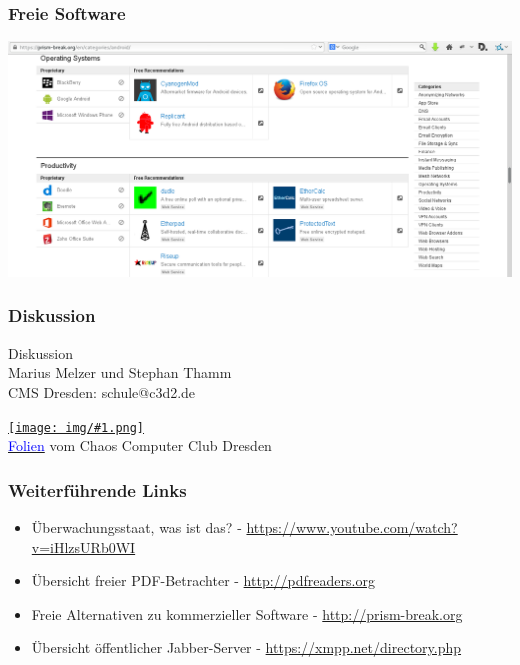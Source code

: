 \documentclass[12pt]{beamer}
\newcommand{\cc}[1]{\texttt{[image: img/\#1.png]}}
\begin{document}
\begin{frame}
    \frametitle{Freie Software}
    \includegraphics[height=0.7\textheight]{img/prism-break2.png}
\end{frame}

\begin{frame}
    \frametitle{Diskussion}
    \begin{center} {\Large Diskussion}\\Marius Melzer und Stephan Thamm\\CMS Dresden: schule@c3d2.de \end{center}
    \begin{center}
      \href{https://creativecommons.org/licenses/by-sa/4.0/}{\cc{by-sa}} \\
      \href{https://github.com/c3d2/cms/tree/master/2014_03_19_schulinformatiktag}{\textcolor{blue}{Folien}} vom Chaos Computer Club Dresden
    \end{center}
\end{frame}

\begin{frame}
    \frametitle{Weiterführende Links}
    \begin{itemize}
        \item Überwachungsstaat, was ist das? - \url{https://www.youtube.com/watch?v=iHlzsURb0WI}
        \item Übersicht freier PDF-Betrachter - \url{http://pdfreaders.org}
        \item Freie Alternativen zu kommerzieller Software - \url{http://prism-break.org}
        \item Übersicht öffentlicher Jabber-Server - \url{https://xmpp.net/directory.php}
    \end{itemize}
\end{frame}
\end{document}
